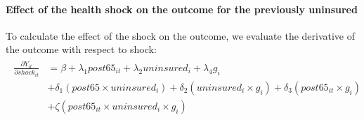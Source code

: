 %
%
%

\paragraph{Effect of the health shock on the outcome for the previously uninsured}
To calculate the effect of the shock on the outcome, we evaluate the derivative of the outcome with respect to shock:
\begin{align}
\begin{aligned}
	\frac{\partial Y_{it}}{\partial shock_{it}}&=\beta+\lambda_1post65_{it}+\lambda_2uninsured_{i}+\lambda_4g_i\\
	&+\delta_1(post65 \times uninsured_i)+\delta_2(uninsured_i \times g_i)+\delta_3(post65_{it} \times g_i)\\
	&+\zeta(post65_{it} \times uninsured_i \times g_i)
\end{aligned}
\end{align}

